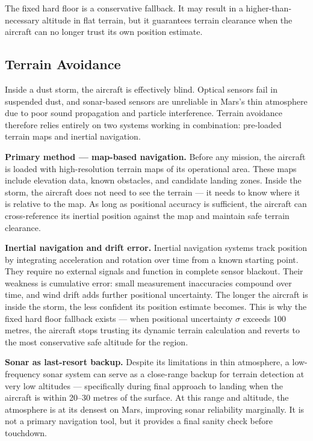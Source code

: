 \documentclass[a4paper,12pt]{article}
\begin{document}
The fixed hard floor is a conservative fallback. It may result in a higher-than-necessary
altitude in flat terrain, but it guarantees terrain clearance when the aircraft can no longer
trust its own position estimate.

\subsection{Terrain Avoidance}
Inside a dust storm, the aircraft is effectively blind. Optical sensors fail in suspended dust,
and sonar-based sensors are unreliable in Mars's thin atmosphere due to poor sound propagation
and particle interference. Terrain avoidance therefore relies entirely on two systems working
in combination: pre-loaded terrain maps and inertial navigation.

\textbf{Primary method — map-based navigation.} Before any mission, the aircraft is loaded with
high-resolution terrain maps of its operational area. These maps include elevation data, known
obstacles, and candidate landing zones. Inside the storm, the aircraft does not need to see the
terrain — it needs to know where it is relative to the map. As long as positional accuracy is
sufficient, the aircraft can cross-reference its inertial position against the map and maintain
safe terrain clearance.

\textbf{Inertial navigation and drift error.} Inertial navigation systems track position by
integrating acceleration and rotation over time from a known starting point. They require no
external signals and function in complete sensor blackout. Their weakness is cumulative error:
small measurement inaccuracies compound over time, and wind drift adds further positional
uncertainty. The longer the aircraft is inside the storm, the less confident its position
estimate becomes. This is why the fixed hard floor fallback exists — when positional uncertainty
$\sigma$ exceeds 100 metres, the aircraft stops trusting its dynamic terrain calculation and
reverts to the most conservative safe altitude for the region.

\textbf{Sonar as last-resort backup.} Despite its limitations in thin atmosphere, a low-frequency
sonar system can serve as a close-range backup for terrain detection at very low altitudes —
specifically during final approach to landing when the aircraft is within 20--30 metres of the
surface. At this range and altitude, the atmosphere is at its densest on Mars, improving sonar
reliability marginally. It is not a primary navigation tool, but it provides a final sanity
check before touchdown.
\end{document}

